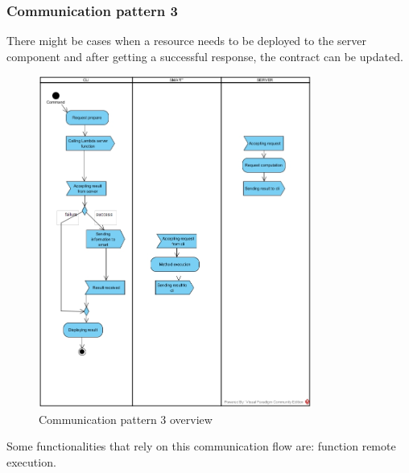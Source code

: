 \subsubsection{Communication pattern 3}
There might be cases when a resource needs to be deployed to the server component and after getting a successful response, the contract can be updated.
\begin{figure}[H]
	\centering
	\includegraphics[width=0.8\textwidth]{res/img/pattern3.jpg}
	\caption{Communication pattern 3 overview}
\end{figure}
\noindent Some functionalities that rely on this communication flow are: function remote execution.

